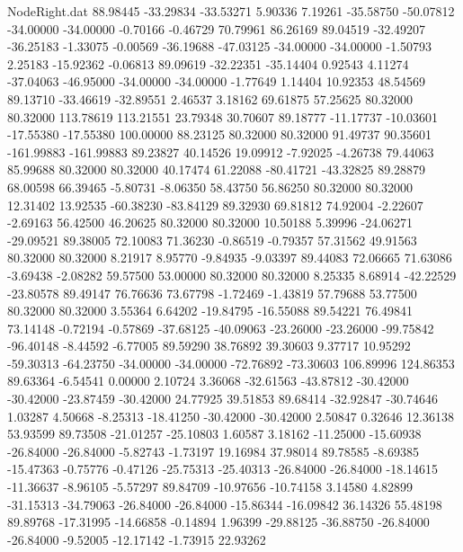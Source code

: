 \begin{filecontents}{NodeRight.dat}
  88.98445  -33.29834  -33.53271     5.90336    7.19261  -35.58750  -50.07812  -34.00000  -34.00000   -0.70166   -0.46729   70.79961   86.26169
  89.04519  -32.49207  -36.25183    -1.33075   -0.00569  -36.19688  -47.03125  -34.00000  -34.00000   -1.50793    2.25183  -15.92362   -0.06813
  89.09619  -32.22351  -35.14404     0.92543    4.11274  -37.04063  -46.95000  -34.00000  -34.00000   -1.77649    1.14404   10.92353   48.54569
  89.13710  -33.46619  -32.89551     2.46537    3.18162   69.61875   57.25625   80.32000   80.32000  113.78619  113.21551   23.79348   30.70607
  89.18777  -11.17737  -10.03601   -17.55380  -17.55380  100.00000   88.23125   80.32000   80.32000   91.49737   90.35601 -161.99883 -161.99883
  89.23827   40.14526   19.09912    -7.92025   -4.26738   79.44063   85.99688   80.32000   80.32000   40.17474   61.22088  -80.41721  -43.32825
  89.28879   68.00598   66.39465    -5.80731   -8.06350   58.43750   56.86250   80.32000   80.32000   12.31402   13.92535  -60.38230  -83.84129
  89.32930   69.81812   74.92004    -2.22607   -2.69163   56.42500   46.20625   80.32000   80.32000   10.50188    5.39996  -24.06271  -29.09521
  89.38005   72.10083   71.36230    -0.86519   -0.79357   57.31562   49.91563   80.32000   80.32000    8.21917    8.95770   -9.84935   -9.03397
  89.44083   72.06665   71.63086    -3.69438   -2.08282   59.57500   53.00000   80.32000   80.32000    8.25335    8.68914  -42.22529  -23.80578
  89.49147   76.76636   73.67798    -1.72469   -1.43819   57.79688   53.77500   80.32000   80.32000    3.55364    6.64202  -19.84795  -16.55088
  89.54221   76.49841   73.14148    -0.72194   -0.57869  -37.68125  -40.09063  -23.26000  -23.26000  -99.75842  -96.40148   -8.44592   -6.77005
  89.59290   38.76892   39.30603     9.37717   10.95292  -59.30313  -64.23750  -34.00000  -34.00000  -72.76892  -73.30603  106.89996  124.86353
  89.63364   -6.54541    0.00000     2.10724    3.36068  -32.61563  -43.87812  -30.42000  -30.42000  -23.87459  -30.42000   24.77925   39.51853
  89.68414  -32.92847  -30.74646     1.03287    4.50668   -8.25313  -18.41250  -30.42000  -30.42000    2.50847    0.32646   12.36138   53.93599
  89.73508  -21.01257  -25.10803     1.60587    3.18162  -11.25000  -15.60938  -26.84000  -26.84000   -5.82743   -1.73197   19.16984   37.98014
  89.78585   -8.69385  -15.47363    -0.75776   -0.47126  -25.75313  -25.40313  -26.84000  -26.84000  -18.14615  -11.36637   -8.96105   -5.57297
  89.84709  -10.97656  -10.74158     3.14580    4.82899  -31.15313  -34.79063  -26.84000  -26.84000  -15.86344  -16.09842   36.14326   55.48198
  89.89768  -17.31995  -14.66858    -0.14894    1.96399  -29.88125  -36.88750  -26.84000  -26.84000   -9.52005  -12.17142   -1.73915   22.93262

\end{filecontents}
